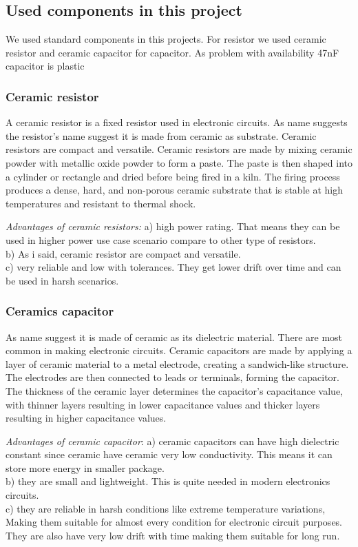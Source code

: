 \documentclass[14pt,a4paper]{extarticle}
\begin{document}
\subsection{Used components in this project}
\label{sec:orge83d8bf}

We used standard components in this projects. For resistor we used ceramic resistor and ceramic capacitor for capacitor. As problem with availability 47nF capacitor is plastic 


\subsubsection{Ceramic resistor}
\label{sec:org4292336}

A ceramic resistor is a fixed resistor used in electronic circuits. As name suggests the resistor's name suggest it is made from ceramic as substrate. Ceramic resistors are compact and versatile. Ceramic resistors are made by mixing ceramic powder with metallic oxide powder to form a paste. The paste is then shaped into a cylinder or rectangle and dried before being fired in a kiln. The firing process produces a dense, hard, and non-porous ceramic substrate that is stable at high temperatures and resistant to thermal shock.

\emph{Advantages of ceramic resistors:} a) high power rating. That means they can be used in higher power use case scenario compare to other type of resistors. \\
b) As i said, ceramic resistor are compact and versatile. \\
c) very reliable and low with tolerances. They get lower drift over time and can be used in harsh scenarios.\\
\subsubsection{Ceramics capacitor}
\label{sec:orgd10013f}

As name suggest it is made of ceramic as its dielectric material. There are most common in making electronic circuits. Ceramic capacitors are made by applying a layer of ceramic material to a metal electrode, creating a sandwich-like structure. The electrodes are then connected to leads or terminals, forming the capacitor. The thickness of the ceramic layer determines the capacitor's capacitance value, with thinner layers resulting in lower capacitance values and thicker layers resulting in higher capacitance values.

\emph{Advantages of ceramic capacitor}: a) ceramic capacitors can have high dielectric constant since ceramic have ceramic very low conductivity. This means it can store more energy in smaller package.\\
b) they are small and lightweight. This is quite needed in modern electronics circuits.\\
c) they are reliable in harsh conditions like extreme temperature variations, Making them suitable for almost every condition for electronic circuit purposes. They are also have very low drift with time making them suitable for long run.
\end{document}
